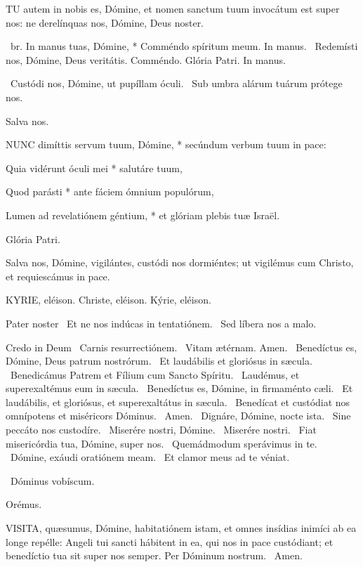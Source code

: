 
\lettrine[lines=2]{T}{U} autem in nobis es, Dómine, et nomen sanctum tuum invocátum est super nos: ne derelínquas nos, Dómine, Deus noster.

\R\ br. In manus tuas, Dómine, * Comméndo spíritum meum. In manus. \V\ Redemísti nos, Dómine, Deus veritátis. Comméndo. Glória Patri. In manus.

\V\ Custódi nos, Dómine, ut pupíllam óculi. \R\ Sub umbra alárum tuárum prótege nos.

 Salva nos.


\lettrine[lines=2]{N}{UNC} dimíttis servum tuum, Dómine, * secúndum verbum tuum in pace:

Quia vidérunt óculi mei * salutáre tuum,

Quod parásti * ante fáciem ómnium populórum,

Lumen ad revelatiónem géntium, * et glóriam plebis tuæ Israël.

Glória Patri.

 Salva nos, Dómine, vigilántes, custódi nos dormiéntes; ut vigilémus cum Christo, et requiescámus in pace.


KYRIE, eléison. Christe, eléison. Kýrie, eléison.

Pater noster  \V\ Et ne nos indúcas in tentatiónem. \R\ Sed líbera nos a malo.

Credo in Deum  \V\ Carnis resurrectiónem. \R\ Vitam ætérnam. Amen. \V\ Benedíctus es, Dómine, Deus patrum nostrórum. \R\ Et laudábilis et gloriósus in sæcula. \V\ Benedicámus Patrem et Fílium cum Sancto Spíritu. \R\ Laudémus, et superexaltémus eum in sæcula. \V\ Benedíctus es, Dómine, in firmaménto cæli. \R\ Et laudábilis, et gloriósus, et superexaltátus in sæcula. \V\ Benedícat et custódiat nos omnípotens et miséricors Dóminus. \R\ Amen. \V\ Dignáre, Dómine, nocte ista. \R\ Sine peccáto nos custodíre. \V\ Miserére nostri, Dómine. \R\ Miserére nostri. \V\ Fiat misericórdia tua, Dómine, super nos. \R\ Quemádmodum sperávimus in te. \V\ Dómine, exáudi oratiónem meam. \R\ Et clamor meus ad te véniat.

\V\ Dóminus vobíscum.

Orémus. 

\lettrine[lines=2]{V}{ISITA}, quæsumus, Dómine, habitatiónem istam, et omnes insídias inimíci ab ea longe repélle: Angeli tui sancti hábitent in ea, qui nos in pace custódiant; et benedíctio tua sit super nos semper. Per Dóminum nostrum. \R\ Amen.

